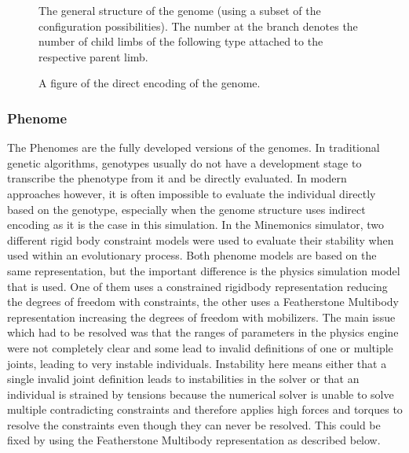 \documentclass[main]{subfiles}
\begin{document}
\begin{figure}[H]
\center


\caption[Possible indirectly encoded genome]{The general structure of the genome (using a subset of the configuration possibilities). The number at the branch denotes the number of child limbs of the following type attached to the respective parent limb.}
\label{figure:indirect-genotype}
\end{figure}

\begin{figure}[H]
\centering


\caption[Directly encoded genome]{A figure of the direct encoding of the genome.}
\label{figure:direct-encoding}
\end{figure}

\subsubsection{Phenome}

The Phenomes are the fully developed versions of the genomes. In traditional genetic algorithms, genotypes usually do not have a development stage to transcribe the phenotype from it and be directly evaluated. In modern approaches however, it is often impossible to evaluate the individual directly based on the genotype, especially when the genome structure uses indirect encoding as it is the case in this simulation.
In the Minemonics simulator, two different rigid body constraint models were used to evaluate their stability when used within an evolutionary process. Both phenome models are based on the same representation, but the important difference is the physics simulation model that is used. One of them uses a constrained rigidbody representation reducing the degrees of freedom with constraints, the other uses a Featherstone Multibody representation increasing the degrees of freedom with mobilizers. The main issue which had to be resolved was that the ranges of parameters in the physics engine were not completely clear and some lead to invalid definitions of one or multiple joints, leading to very instable individuals. Instability here means either that a single invalid joint definition leads to instabilities in the solver or that an individual is strained by tensions because the numerical solver is unable to solve multiple contradicting constraints and therefore applies high forces and torques to resolve the constraints even though they can never be resolved. This could be fixed by using the Featherstone Multibody representation as described below. 
\end{document}
